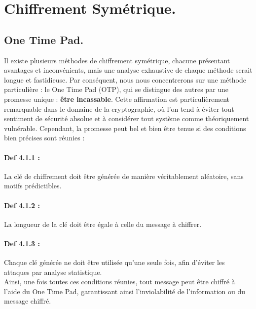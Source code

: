 \documentclass{article}
\begin{document}
\section{Chiffrement Symétrique.}\label{one-time-pad-et-chiffrement-symuxe9trique.}

\subsection{One Time Pad.}

Il existe plusieurs méthodes de chiffrement symétrique, chacune
présentant avantages et inconvénients, mais une analyse exhaustive de
chaque méthode serait longue et fastidieuse. Par conséquent, nous nous concentrerons sur une méthode particulière : le One Time Pad (OTP), qui
se distingue des autres par une promesse unique : \textbf{être
	incassable}. Cette affirmation est particulièrement remarquable dans le
domaine de la cryptographie, où l'on tend à éviter tout sentiment de
sécurité absolue et à considérer tout système comme théoriquement
vulnérable. Cependant, la promesse peut bel et bien être tenue si des
conditions bien précises sont réunies :

\paragraph{Def 4.1.1 :}\label{def-4.1.1}

La clé de chiffrement doit être générée de manière véritablement
aléatoire, sans motifs prédictibles.

\paragraph{Def 4.1.2 :}\label{def-4.1.2}

La longueur de la clé doit être égale à celle du message à chiffrer.

\paragraph{Def 4.1.3 :}\label{def-4.1.3}

Chaque clé générée ne doit être utilisée qu'une seule fois, afin
d'éviter les attaques par analyse statistique.
\\

Ainsi, une fois toutes ces conditions réunies, tout message peut être
chiffré à l'aide du One Time Pad, garantissant ainsi l'inviolabilité de
l'information ou du message chiffré. \\
\end{document}

